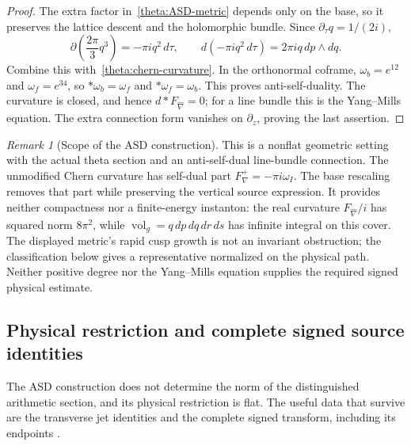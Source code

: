 \documentclass[11pt]{article}
\numberwithin{equation}{section}
\theoremstyle{definition}
\theoremstyle{remark}
\newtheorem{remark}[theorem]{Remark}
\begin{document}
\begin{proof}
The extra factor in~\eqref{theta:ASD-metric} depends only on the base,
so it preserves the lattice descent and the holomorphic bundle.
Since $\partial_\tau q=1/(2i)$,
\[
 \partial\!\left(\frac{2\pi}{3}q^3\right)
       =-\pi i q^2\,d\tau,
 \qquad d(-\pi i q^2\,d\tau)=2\pi i q\,dp\wedge dq.
\]
Combine this with~\eqref{theta:chern-curvature}.
In the orthonormal coframe, $\omega_b=e^{12}$ and
$\omega_f=e^{34}$, so $*\omega_b=\omega_f$ and
$*\omega_f=\omega_b$.  This proves anti-self-duality.
The curvature is closed, and hence $d*F_{\widehat\nabla}=0$;
for a line bundle this is the Yang--Mills equation.
The extra connection form vanishes on $\partial_z$, proving the last
assertion.
\end{proof}

\begin{remark}[Scope of the ASD construction]
\label{theta:ASD-limits}
This is a nonflat geometric setting with the actual theta section and
an anti-self-dual line-bundle connection. The unmodified Chern curvature
has self-dual part $F_\nabla^+=-\pi i\omega_I$. The base rescaling
removes that part while preserving the vertical source expression.
It provides neither compactness nor a finite-energy instanton: the
real curvature $F_{\widehat\nabla}/i$ has squared norm $8\pi^2$, while
$\operatorname{vol}_g=q\,dp\,dq\,dr\,ds$ has infinite integral on this
cover. The displayed metric's rapid cusp growth is not an invariant
obstruction; the classification below gives a representative normalized
on the physical path. Neither positive degree nor the Yang--Mills
equation supplies the required signed physical estimate.
\end{remark}

\subsection{Physical restriction and complete signed source identities}
\label{theta:complete-source-bridge}

The ASD construction does not determine the norm of the distinguished
arithmetic section, and its physical restriction is flat.  The useful
data that survive are the transverse jet identities and the complete
signed transform, including its endpoints \cite{ThetaMetric,ThetaBridge}.
\end{document}
